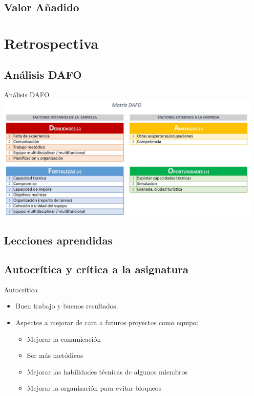 \documentclass{beamer}
\begin{document}
\subsection{Valor A\~nadido}

\section{Retrospectiva}

\subsection{An\'alisis DAFO}

\begin{frame}{An\'alisis DAFO}
	\includegraphics[width=0.8\paperwidth, height=0.8\paperheight]{images_latex/DAFO}
	  
\end{frame}

\subsection{Lecciones aprendidas}

\subsection{Autocr\'itica y cr\'itica a la asignatura}

\begin{frame}{Autocr\'itica}
  \begin{itemize}
  \item { Buen trabajo y buenos resultados. }
  \item { Aspectos a mejorar de cara a futuros proyectos como equipo:
    \begin{itemize}
    \item {Mejorar la comunicaci\'on}
    \item {Ser m\'as met\'odicos}
    \item {Mejorar las habilidades t\'ecnicas de algunos miembros}
    \item {Mejorar la organizaci\'on para evitar bloqueos}
    \end{itemize}
  }
  \end{itemize}
\end{frame}
\end{document}
